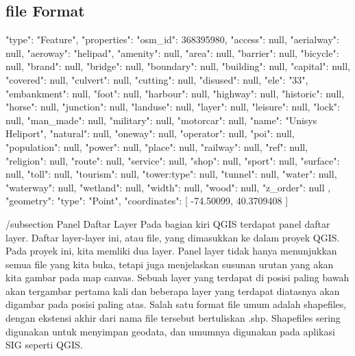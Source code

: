 \subsection{file Format}
{
"type": "Feature",
"properties": {
    "osm_id": 368395980,
    "access": null,
    "aerialway": null,
    "aeroway": "helipad",
    "amenity": null,
    "area": null,
    "barrier": null,
    "bicycle": null,
    "brand": null,
    "bridge": null,
    "boundary": null,
    "building": null,
    "capital": null,
    "covered": null,
    "culvert": null,
    "cutting": null,
    "disused": null,
    "ele": "33",
    "embankment": null,
    "foot": null,
    "harbour": null,
    "highway": null,
    "historic": null,
    "horse": null,
    "junction": null,
    "landuse": null,
    "layer": null,
    "leisure": null,
    "lock": null,
    "man_made": null,
    "military": null,
    "motorcar": null,
    "name": "Unisys Heliport",
    "natural": null,
    "oneway": null,
    "operator": null,
    "poi": null,
    "population": null,
    "power": null,
    "place": null,
    "railway": null,
    "ref": null,
    "religion": null,
    "route": null,
    "service": null,
    "shop": null,
    "sport": null,
    "surface": null,
    "toll": null,
    "tourism": null,
    "tower:type": null,
    "tunnel": null,
    "water": null,
    "waterway": null,
    "wetland": null,
    "width": null,
    "wood": null,
    "z_order": null
},
"geometry": {
    "type": "Point",
    "coordinates": [
        -74.50099,
        40.3709408
    ]
}
}

/subsection {Panel Daftar Layer}
    Pada bagian kiri QGIS terdapat panel daftar layer. Daftar layer-layer ini, atau file, yang dimasukkan ke dalam proyek QGIS. Pada proyek ini, kita memliki dua layer.
    Panel layer tidak hanya menunjukkan semua file yang kita buka, tetapi juga menjelaskan susunan urutan yang akan kita gambar pada map canvas. Sebuah layer yang terdapat di posisi paling bawah akan tergambar pertama kali dan beberapa layer yang terdapat diatasnya akan digambar pada posisi paling atas.
    Salah satu format file umum adalah shapefiles, dengan ekstensi akhir dari nama file tersebut bertuliskan .shp. Shapefiles sering digunakan untuk menyimpan geodata, dan umumnya digunakan pada aplikasi SIG seperti QGIS.
